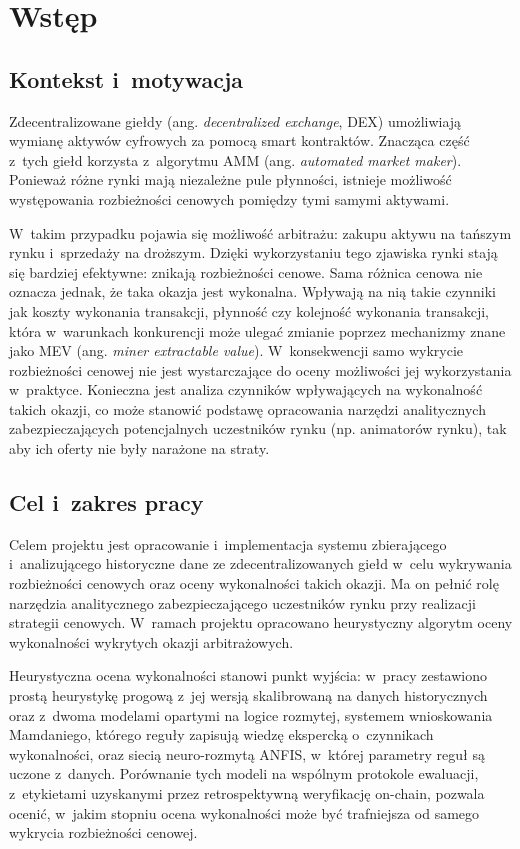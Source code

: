 \newpage
\section{Wstęp}
\subsection{Kontekst i~motywacja}

Zdecentralizowane giełdy (ang. \emph{decentralized exchange}, DEX) umożliwiają wymianę aktywów
cyfrowych za pomocą smart kontraktów. Znacząca część z~tych giełd korzysta z~algorytmu AMM
(ang. \emph{automated market maker}). Ponieważ różne rynki mają niezależne pule płynności,
istnieje możliwość występowania rozbieżności cenowych pomiędzy tymi samymi aktywami.

W~takim przypadku pojawia się możliwość arbitrażu: zakupu aktywu na tańszym rynku i~sprzedaży na
droższym. Dzięki wykorzystaniu tego zjawiska rynki stają się bardziej efektywne: znikają
rozbieżności cenowe. Sama różnica cenowa nie oznacza jednak, że taka okazja jest wykonalna.
Wpływają na nią takie czynniki jak koszty wykonania transakcji, płynność czy kolejność wykonania
transakcji, która w~warunkach konkurencji może ulegać zmianie poprzez mechanizmy znane jako MEV
(ang. \emph{miner extractable value}). W~konsekwencji samo wykrycie rozbieżności cenowej nie
jest wystarczające do oceny możliwości jej wykorzystania w~praktyce. Konieczna jest analiza
czynników wpływających na wykonalność takich okazji, co może stanowić podstawę opracowania
narzędzi analitycznych zabezpieczających potencjalnych uczestników rynku (np. animatorów
rynku), tak aby ich oferty nie były narażone na straty.

\subsection{Cel i~zakres pracy}

Celem projektu jest opracowanie i~implementacja systemu zbierającego i~analizującego
historyczne dane ze zdecentralizowanych giełd w~celu wykrywania rozbieżności cenowych oraz
oceny wykonalności takich okazji. Ma on pełnić rolę narzędzia analitycznego zabezpieczającego
uczestników rynku przy realizacji strategii cenowych. W~ramach projektu opracowano
heurystyczny algorytm oceny wykonalności wykrytych okazji arbitrażowych.

Heurystyczna ocena wykonalności stanowi punkt wyjścia: w~pracy zestawiono prostą heurystykę
progową z~jej wersją skalibrowaną na danych historycznych oraz z~dwoma modelami opartymi na
logice rozmytej, systemem wnioskowania Mamdaniego, którego reguły zapisują wiedzę ekspercką
o~czynnikach wykonalności, oraz siecią neuro-rozmytą ANFIS, w~której parametry reguł są uczone
z~danych. Porównanie tych modeli na wspólnym protokole ewaluacji, z~etykietami uzyskanymi przez
retrospektywną weryfikację on-chain, pozwala ocenić, w~jakim stopniu ocena wykonalności może
być trafniejsza od samego wykrycia rozbieżności cenowej.

